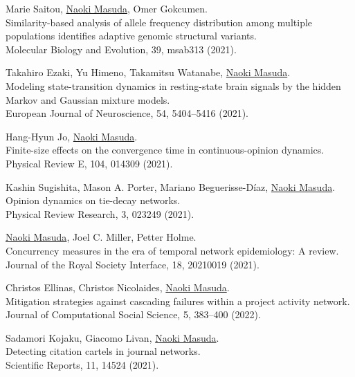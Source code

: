 \documentclass[11pt,letter]{article}
\begin{document}
\begin{etaremune}
\item Marie Saitou, \underline{Naoki Masuda}, Omer Gokcumen.\\
Similarity-based analysis of allele frequency distribution among multiple populations identifies adaptive genomic structural variants.\\
Molecular Biology and Evolution, 39, msab313 (2021).

\item Takahiro Ezaki, Yu Himeno, Takamitsu Watanabe, \underline{Naoki Masuda}.\\
Modeling state-transition dynamics in resting-state brain signals by the hidden Markov and Gaussian mixture models.\\
European Journal of Neuroscience, 54, 5404--5416 (2021).

\item Hang-Hyun Jo, \underline{Naoki Masuda}.\\
Finite-size effects on the convergence time in continuous-opinion dynamics.\\
Physical Review E, 104, 014309 (2021).

\item Kashin Sugishita, Mason A. Porter, Mariano Beguerisse-D\'{i}az, \underline{Naoki Masuda}.\\
Opinion dynamics on tie-decay networks.\\
Physical Review Research, 3, 023249 (2021).

\item \underline{Naoki Masuda}, Joel C. Miller, Petter Holme.\\
Concurrency measures in the era of temporal network epidemiology: A review.\\
Journal of the Royal Society Interface, 18, 20210019 (2021).

\item Christos Ellinas, Christos Nicolaides, \underline{Naoki Masuda}.\\
Mitigation strategies against cascading failures within a project activity network.\\
Journal of Computational Social Science, 5, 383--400 (2022).

\item Sadamori Kojaku, Giacomo Livan, \underline{Naoki Masuda}.\\
Detecting citation cartels in journal networks.\\
Scientific Reports, 11, 14524 (2021).


\end{etaremune}
\end{document}
